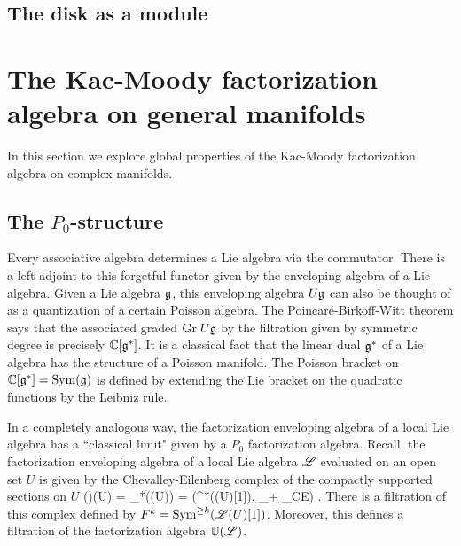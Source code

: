 \documentclass[10pt]{amsart}
\begin{document}

\subsection{The disk as a module}

\section{The Kac-Moody factorization algebra on general manifolds}

In this section we explore global properties of the Kac-Moody factorization algebra on complex manifolds. 

\subsection{The $P_0$-structure}

Every associative algebra determines a Lie algebra via the commutator. 
There is a left adjoint to this forgetful functor given by the enveloping algebra of a Lie algebra. 
Given a Lie algebra $\mathfrak g$, this enveloping algebra $U \mathfrak g$ can also be thought of as a quantization of a certain Poisson algebra.
The Poincar\'{e}-Birkoff-Witt theorem says that the associated graded ${\rm Gr} \; U \mathfrak g$ by the filtration given by symmetric degree is precisely $\mathbb C[\mathfrak g^*]$.
It is a classical fact that the linear dual $\mathfrak g^*$ of a Lie algebra has the structure of a Poisson manifold. 
The Poisson bracket on $\mathbb C[\mathfrak g^*] = {\rm Sym}(\mathfrak g)$ is defined by extending the Lie bracket on the quadratic functions by the Leibniz rule. 

In a completely analogous way, the factorization enveloping algebra of a local Lie algebra has a ``classical limit" given by a $P_0$ factorization algebra. 
Recall, the factorization enveloping algebra of a local Lie algebra $\mathscr L$ evaluated on an open set $U$ is given by the Chevalley-Eilenberg complex of the compactly supported sections on $U$
\ben
\UU(\sL)(U) = \clieu_*(\sL(U)) = \left(\Sym^*(\sL(U)[1]), \d_\sL + \d_{CE}\right) .
\een
There is a filtration of this complex defined by $F^k = {\rm Sym}^{\geq k} (\mathscr L (U)[1])$. 
Moreover, this defines a filtration of the factorization algebra $\mathbb U(\mathscr L)$. 
\end{document}
